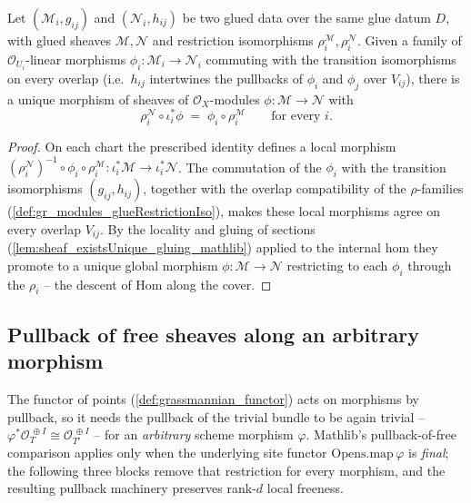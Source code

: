 \begin{definition}
  \label{def:gr_modules_glueHom}
  Let \((\mathcal{M}_i, g_{ij})\) and \((\mathcal{N}_i, h_{ij})\) be two glued data
  over the same glue datum \(D\), with glued sheaves \(\mathcal{M}, \mathcal{N}\) and
  restriction isomorphisms \(\rho^{\mathcal{M}}_i, \rho^{\mathcal{N}}_i\). Given a family
  of \(\mathcal{O}_{U_i}\)-linear morphisms \(\phi_i : \mathcal{M}_i \to \mathcal{N}_i\)
  commuting with the transition isomorphisms on every overlap (i.e.\ \(h_{ij}\) intertwines
  the pullbacks of \(\phi_i\) and \(\phi_j\) over \(V_{ij}\)), there is a unique morphism
  of sheaves of \(\mathcal{O}_X\)-modules \(\phi : \mathcal{M} \to \mathcal{N}\) with
  \[
    \rho^{\mathcal{N}}_i \circ \iota_i^{*}\phi \;=\; \phi_i \circ \rho^{\mathcal{M}}_i
    \qquad \text{for every } i.
  \]
\end{definition}
\begin{proof}
  On each chart the prescribed identity defines a local morphism
  \((\rho^{\mathcal{N}}_i)^{-1} \circ \phi_i \circ \rho^{\mathcal{M}}_i :
  \iota_i^{*}\mathcal{M} \to \iota_i^{*}\mathcal{N}\). The commutation of the \(\phi_i\)
  with the transition isomorphisms \((g_{ij}, h_{ij})\), together with the overlap
  compatibility of the \(\rho\)-families (\cref{def:gr_modules_glueRestrictionIso}), makes
  these local morphisms agree on every overlap \(V_{ij}\). By the locality and gluing of
  sections (\cref{lem:sheaf_existsUnique_gluing_mathlib}) applied to the internal hom they
  promote to a unique global morphism \(\phi : \mathcal{M} \to \mathcal{N}\) restricting
  to each \(\phi_i\) through the \(\rho_i\) -- the descent of \(\mathrm{Hom}\) along the
  cover.
\end{proof}

\subsection{Pullback of free sheaves along an arbitrary morphism}
\label{sec:grquot_pullback_free}

The functor of points (\cref{def:grassmannian_functor}) acts on morphisms by pullback, so
it needs the pullback of the trivial bundle to be again trivial --
\(\varphi^{*}\mathcal{O}_T^{\,\oplus I} \cong \mathcal{O}_{T'}^{\,\oplus I}\) -- for an
\emph{arbitrary} scheme morphism \(\varphi\). Mathlib's pullback-of-free comparison applies
only when the underlying site functor \(\mathrm{Opens.map}\,\varphi\) is \emph{final}; the
following three blocks remove that restriction for every morphism, and the resulting
pullback machinery preserves rank-\(d\) local freeness.

